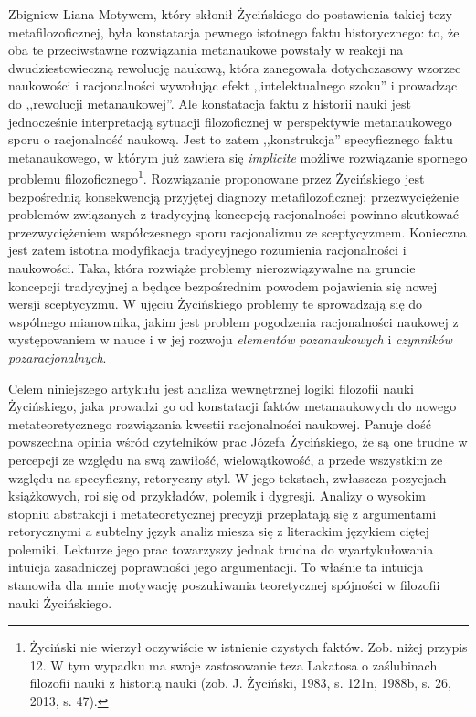 \begin{artplenv}{Zbigniew Liana}
Motywem, który skłonił Życińskiego do postawienia takiej tezy metafilozoficznej, była konstatacja pewnego istotnego
faktu historycznego: to, że oba te przeciwstawne rozwiązania metanaukowe powstały w reakcji na dwudziestowieczną
rewolucję naukową, która zanegowała dotychczasowy wzorzec naukowości i racjonalności wywołując efekt ,,intelektualnego
szoku'' i prowadząc do ,,rewolucji metanaukowej''. Ale konstatacja faktu z historii nauki jest jednocześnie interpretacją
sytuacji filozoficznej w perspektywie metanaukowego sporu o racjonalność naukową. Jest to zatem ,,konstrukcja''
specyficznego faktu metanaukowego, w którym już zawiera się \textit{implicite} możliwe rozwiązanie spornego problemu
filozoficznego\footnote{Życiński nie wierzył oczywiście w istnienie czystych faktów. Zob. niżej przypis 12. W tym
	wypadku ma swoje zastosowanie teza Lakatosa o zaślubinach filozofii nauki z historią nauki
	\label{ref:RNDS7T4vadlBl}(zob. J. Życiński, 1983, s. 121n, 1988b, s. 26, 2013, s. 47).}. Rozwiązanie proponowane przez
Życińskiego jest bezpośrednią konsekwencją przyjętej diagnozy metafilozoficznej: przezwyciężenie problemów związanych z
tradycyjną koncepcją racjonalności powinno skutkować przezwyciężeniem współczesnego sporu racjonalizmu ze sceptycyzmem.
Konieczna jest zatem istotna modyfikacja tradycyjnego rozumienia racjonalności i naukowości. Taka, która rozwiąże
problemy nierozwiązywalne na gruncie koncepcji tradycyjnej a będące bezpośrednim powodem pojawienia się nowej wersji
sceptycyzmu. W ujęciu Życińskiego problemy te sprowadzają się do wspólnego mianownika, jakim jest problem pogodzenia
racjonalności naukowej z występowaniem w nauce i w jej rozwoju \textit{elementów pozanaukowych} i \textit{czynników
	pozaracjonalnych}.

Celem niniejszego artykułu jest analiza wewnętrznej logiki filozofii nauki Życińskiego, jaka prowadzi go od konstatacji
faktów metanaukowych do nowego metateoretycznego rozwiązania kwestii racjonalności naukowej. Panuje dość powszechna
opinia wśród czytelników prac Józefa Życińskiego, że są one trudne w percepcji ze względu na swą zawiłość,
wielowątkowość, a przede wszystkim ze względu na specyficzny, retoryczny styl. W jego tekstach, zwłaszcza pozycjach
książkowych, roi się od przykładów, polemik i dygresji. Analizy o wysokim stopniu abstrakcji i metateoretycznej
precyzji przeplatają się z argumentami retorycznymi a subtelny język analiz miesza się z literackim językiem ciętej
polemiki. Lekturze jego prac towarzyszy jednak trudna do wyartykułowania intuicja zasadniczej poprawności jego
argumentacji. To właśnie ta intuicja stanowiła dla mnie motywację poszukiwania teoretycznej spójności w filozofii nauki
Życińskiego.


\end{artplenv}
